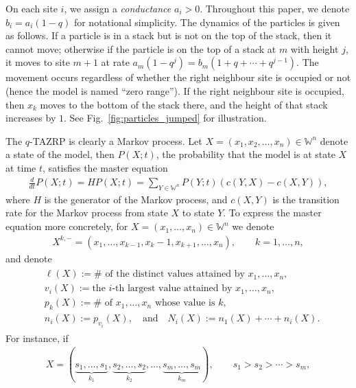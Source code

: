 \documentclass[11pt]{article}
\numberwithin{equation}{section}
\newcommand{\Weylchamber}{\mathbb{W}}
\begin{document}
On each site $i$, we assign a \emph{conductance} $a_i > 0$. Throughout this paper, we denote $b_i = a_i(1 - q)$ for notational simplicity. The dynamics of the particles is given as follows.
If a particle is in a stack but is not on the top of the stack, then it cannot move; otherwise if the particle is on the top of a stack at $m$ with height $j$, it moves to site $m + 1$ at rate $a_m(1 - q^j) = b_m(1 + q + \dotsb + q^{j - 1})$.
The movement occurs regardless of whether the right neighbour site is occupied or not (hence the model is named ``zero range''). If the right neighbour site is occupied, then $x_k$ moves to the bottom of the stack there, and the height of that stack increases by $1$. See Fig.~\ref{fig:particles_jumped} for illustration.

The $q$-TAZRP is clearly a Markov process. Let $X = (x_1, x_2, \dotsc, x_n) \in \Weylchamber^n$ denote a state of the model, then $P(X; t)$, the probability that the model is at state $X$ at time $t$, satisf\/ies the master equation
\begin{gather} \label{eq:abstract_master_eq}
 \frac{d}{dt} P(X; t) = H P(X; t) = \sum_{Y \in \Weylchamber^n} P(Y; t) (c(Y, X) - c(X, Y)),
\end{gather}
where $H$ is the generator of the Markov process, and $c(X, Y)$ is the transition rate for the Markov process from state $X$ to state $Y$. To express the master equation more concretely, for $X = (x_1, \dotsc, x_n) \in \Weylchamber^n$ we denote
\begin{gather*}
 X^{k, -} = (x_1, \dotsc, x_{k - 1}, x_k - 1, x_{k + 1}, \dotsc, x_n), \qquad k = 1, \dotsc, n,
\end{gather*}
and denote
\begin{gather} \label{eq:various_notations}
 \begin{split}
 & \ell(X) :=  \text{$\#$ of the distinct values attained by $x_1, \dotsc, x_n$}, \\
 & v_i(X) :=  \text{the $i$-th largest value attained by $x_1, \dotsc, x_n$}, \\
& p_k(X) :=  \text{$\#$ of $x_1, \dotsc, x_n$ whose value is $k$}, \\
 & n_i(X) :=  p_{v_i}(X), \quad \text{and} \quad N_i(X) := n_1(X) + \dotsb + n_i(X).
 \end{split}
\end{gather}
For instance, if
\begin{gather} \label{eq:general_X}
 X = (\underbrace{s_1, \dotsc, s_1}_{k_1}, \underbrace{s_2, \dotsc, s_2}_{k_2}, \dotsc, \underbrace{s_m, \dotsc, s_m}_{k_m}), \qquad s_1 > s_2 > \dotsb > s_m,
\end{gather}
\end{document}
